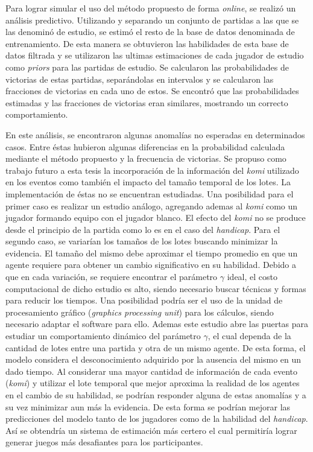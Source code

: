 \documentclass[11pt,twoside,spanish]{report} %
\begin{document}
Para lograr simular el uso del m\'etodo propuesto de forma \textit{online}, se realiz\'o un  an\'alisis predictivo.
Utilizando y separando un conjunto de partidas a las que se las denomin\'o de estudio, se estim\'o el resto de la base de datos denominada de entrenamiento.
De esta manera se obtuvieron las habilidades de esta base de datos filtrada y se utilizaron las ultimas estimaciones de cada jugador de estudio como \textit{priors} para las partidas de estudio.
Se calcularon las probabilidades de victorias de estas partidas, separ\'andolas en intervalos y se calcularon las fracciones de victorias en cada uno de estos.
Se encontr\'o que las probabilidades estimadas y las fracciones de victorias eran similares, mostrando un correcto comportamiento.

En este an\'alisis, se encontraron algunas anomal\'ias no esperadas en determinados casos.
Entre \'estas hubieron algunas diferencias en la probabilidad calculada mediante el m\'etodo propuesto y la frecuencia de victorias.
Se propuso como trabajo futuro a esta tesis la incorporaci\'on de la informaci\'on del \textit{komi} utilizado en los eventos como tambi\'en el impacto del tama\~no temporal de los lotes.
La implementaci\'on de \'estas no se encuentran estudiadas.
Una posibilidad para el primer caso es realizar un estudio an\'alogo, agregando ademas al \textit{komi} como un jugador formando equipo con el jugador blanco.
El efecto del \textit{komi} no se produce desde el principio de la partida como lo es en el caso del \textit{handicap}.
Para el segundo caso, se variar\'ian los tama\~nos de los lotes buscando minimizar la evidencia.
El tama\~no del mismo debe aproximar el tiempo promedio en que un agente requiere para obtener un cambio significativo en su habilidad.
Debido a que en cada variaci\'on, se requiere encontrar el par\'ametro $\gamma$ ideal, el costo computacional de dicho estudio es alto, siendo necesario buscar t\'ecnicas y formas para reducir los tiempos.
Una posibilidad podr\'ia ser el uso de la unidad de procesamiento gr\'afico (\textit{graphics processing unit}) para los c\'alculos, siendo necesario adaptar el software para ello.
Ademas este estudio abre las puertas para estudiar un comportamiento din\'amico del par\'ametro $\gamma$, el cual dependa de la cantidad de lotes entre una partida y otra de un mismo agente.
De esta forma, el modelo considera el desconocimiento adquirido por la ausencia del mismo en un dado tiempo.
Al considerar una mayor cantidad de informaci\'on de cada evento (\textit{komi}) y utilizar el lote temporal que mejor aproxima la realidad de los agentes en el cambio de su habilidad, se podr\'ian responder alguna de estas anomal\'ias y a su vez minimizar aun m\'as la evidencia.
De esta forma se podr\'ian mejorar las predicciones del modelo tanto de los jugadores como de la habilidad del \textit{handicap}.
As\'i se obtendr\'ia un sistema de estimaci\'on m\'as certero el cual permitir\'ia lograr generar juegos m\'as desafiantes para los participantes.
\end{document}
